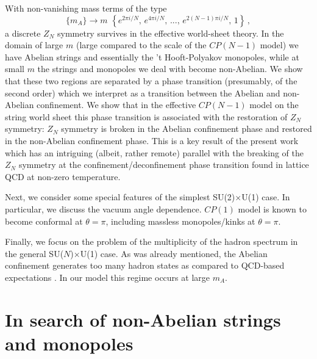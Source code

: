 With non-vanishing mass terms of the type
$$
\{m_A\} \longrightarrow m  \,\,   \left\{  e^{2\pi i/N} , \,e^{4\pi i/N},\, ... ,
 \,e^{2(N-1)\pi i/N} , \, 1\right\} \,,
$$
 a discrete $Z_N$ symmetry survives in the effective 
world-sheet theory. In the domain of large $m$ 
(large compared to the scale of the $CP(N-1)$ model) we have Abelian strings
and essentially the 't Hooft-Polyakov
monopoles, while at small $m$ the strings and monopoles
we deal with  become
non-Abelian. We show that 
these two regions are separated by a phase transition (presumably,
of the second order)
which we interpret as a transition between the Abelian and non-Abelian
confinement. 
We show that in the effective $CP(N-1)$ model on the string world sheet
this phase transition is associated with the 
restoration of $Z_N$ symmetry: $Z_N$ symmetry is broken in the
Abelian confinement phase and restored in the non-Abelian confinement
phase. This is a key result 
of the present work which has an intriguing 
(albeit, rather remote) parallel with the breaking
of the $Z_N$ symmetry  at the confinement/deconfinement phase transition
 found in lattice QCD at non-zero temperature.

Next, we consider some special features of  the simplest  
SU(2)$\times$U(1) case.  In particular, we
discuss the vacuum angle dependence. $CP(1)$ model is known to 
become conformal at $\theta=\pi$, including massless monopoles/kinks
at $\theta=\pi$.

Finally, we focus on the problem of the multiplicity of the hadron 
spectrum in the general SU($N$)$\times$U(1) case. 
As was already mentioned, the Abelian confinement generates too many
hadron states as compared to QCD-based  expectations  \cite{DS,matt,VY}.
In our model this regime occurs at large $m_A$. 

\section{In search of non-Abelian strings and monopoles}
\label{search}

